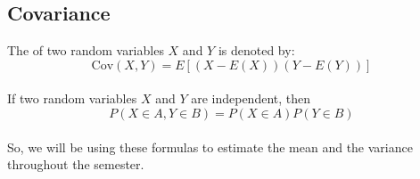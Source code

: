 \documentclass[11pt]{article}
\begin{document}
\subsection{Covariance}

The  of two random variables $X$ and $Y$ is denoted by:
\[
    \text{Cov}(X, Y) = E\left[(X - E(X))(Y - E(Y))\right]
\]
\\
If two random variables $X$ and $Y$ are independent, then
\[
    P(X\in A, Y \in B) = P(X\in A)P(Y\in B)
\]
\\
So, we will be using these formulas to estimate the mean and the variance throughout the semester.
\end{document}
